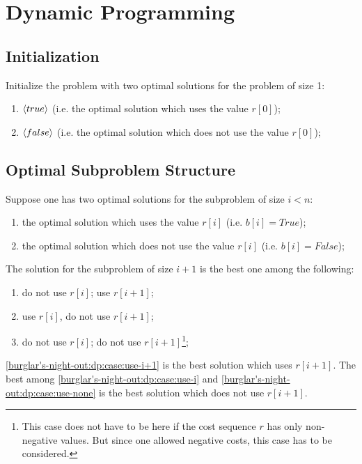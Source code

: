\section{Dynamic Programming}

\subsection{Initialization}

Initialize the problem with two optimal solutions for the problem of size 1:

\begin{enumerate}
    \item $\left\langle true \right\rangle$  (i.e. the optimal solution which uses the value $r[0]$);
    \item $\left\langle false \right\rangle$ (i.e. the optimal solution which does not use the value $r[0]$);
\end{enumerate}

\subsection{Optimal Subproblem Structure}

Suppose one has two optimal solutions for the subproblem of size $i < n$:

\begin{enumerate}
    \item the optimal solution which uses the value $r[i]$ (i.e. $b[i] = True$);
    \item the optimal solution which does not use the value $r[i]$ (i.e. $b[i] = False$);
\end{enumerate}

The solution for the subproblem of size $i+1$ is the best one among the following:

\begin{enumerate}
    \item\label{burglar's-night-out:dp:case:use-i+1} do not use $r[i]$; use $r[i+1]$;
    \item\label{burglar's-night-out:dp:case:use-i} use $r[i]$, do not use $r[i+1]$;
    \item\label{burglar's-night-out:dp:case:use-none} do not use $r[i]$; do not use $r[i+1]$\footnote{This case does not have to be here if the cost sequence $r$ has only non-negative values. But since one allowed negative costs, this case has to be considered.};
\end{enumerate}

\ref{burglar's-night-out:dp:case:use-i+1} is the best solution which uses $r[i+1]$. The best among \ref{burglar's-night-out:dp:case:use-i} and \ref{burglar's-night-out:dp:case:use-none} is the best solution which does not use $r[i+1]$.


